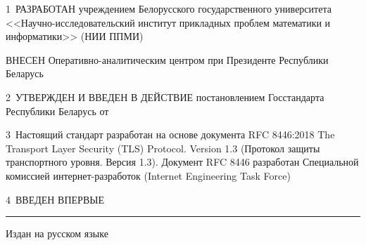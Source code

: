 \vskip0.2cm

1~РАЗРАБОТАН учреждением Белорусского государственного университета 
<<Науч\-но-исследовательский  институт прикладных проблем математики и 
информатики>> (НИИ ППМИ)

ВНЕСЕН Оперативно-аналитическим центром при Президенте Республики Беларусь 

2~УТВЕРЖДЕН И ВВЕДЕН В ДЕЙСТВИЕ постановлением Госстандарта Республики 
Беларусь от $\phantom{\text{22 мая 2014 г.}}$~\No~$\phantom{23}$

3~Настоящий стандарт разработан на основе документа RFC 8446:2018 The 
Transport Layer Security (TLS) Protocol. Version 1.3 (Протокол защиты 
транспортного уровня. Версия 1.3). Документ RFC 8446 разработан 
Специальной комиссией интернет-разработок (Internet Engineering Task 
Force)

4~ВВЕДЕН ВПЕРВЫЕ

\vfill
\hrule
\vskip1mm
Издан на русском языке

\pagebreak
